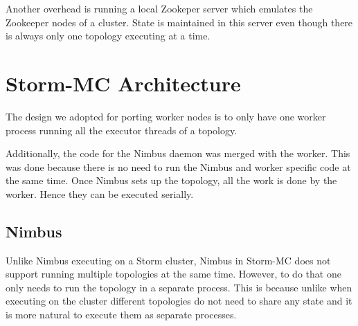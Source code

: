 Another overhead is running a local Zookeper server which emulates the Zookeeper nodes of a cluster. State is maintained in this server even though there is always only one topology executing at a time.


\section{Storm-MC Architecture}
\label{sec:storm_mc_arch}


The design we adopted for porting worker nodes is to only have one worker process running all the executor threads of a topology.

Additionally, the code for the Nimbus daemon was merged with the worker. This was done because there is no need to run the Nimbus and worker specific code at the same time. Once Nimbus sets up the topology, all the work is done by the worker. Hence they can be executed serially.

\subsection{Nimbus}

Unlike Nimbus executing on a Storm cluster, Nimbus in Storm-MC does not support running multiple topologies at the same time. However, to do that one only needs to run the topology in a separate process. This is because unlike when executing on the cluster different topologies do not need to share any state and it is more natural to execute them as separate processes.

